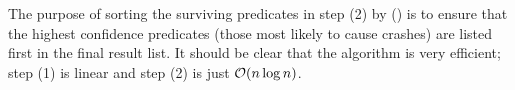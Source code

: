 The purpose of sorting the surviving predicates in step (2) by
\crash() is to ensure that the highest confidence predicates (those
most likely to cause crashes) are listed first in the final result
list.  It should be clear that the algorithm is very efficient; step (1) is
linear and step (2) is just ${\cal O}(n\log n)$.

